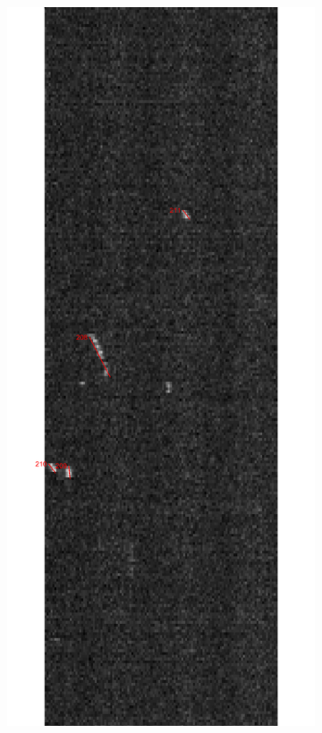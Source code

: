 \documentclass[english, %
parskip=full, %
bibliography=totoc, %
]{scrartcl}
\begin{document}
\begin{figure}[!hb]
	\centering
	\begin{subfigure}[b]{0.4\textwidth}
	   \includegraphics[width=\textwidth]{Auswertungsbild_oben}

\end{subfigure}
\end{figure}
\end{document}
